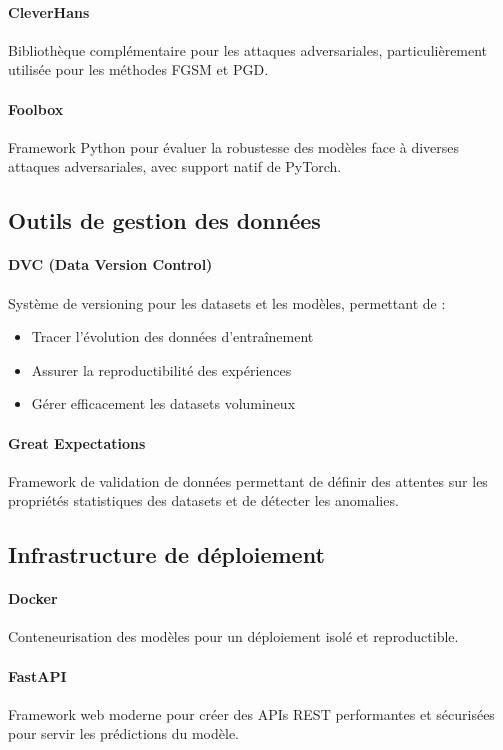 \paragraph{CleverHans}
Bibliothèque complémentaire pour les attaques adversariales, particulièrement utilisée pour les méthodes FGSM et PGD.

\paragraph{Foolbox}
Framework Python pour évaluer la robustesse des modèles face à diverses attaques adversariales, avec support natif de PyTorch.

\subsection{Outils de gestion des données}

\paragraph{DVC (Data Version Control)}
Système de versioning pour les datasets et les modèles, permettant de :
\begin{itemize}
    \item Tracer l'évolution des données d'entraînement
    \item Assurer la reproductibilité des expériences
    \item Gérer efficacement les datasets volumineux
\end{itemize}

\paragraph{Great Expectations}
Framework de validation de données permettant de définir des attentes sur les propriétés statistiques des datasets et de détecter les anomalies.

\subsection{Infrastructure de déploiement}

\paragraph{Docker}
Conteneurisation des modèles pour un déploiement isolé et reproductible.

\paragraph{FastAPI}
Framework web moderne pour créer des APIs REST performantes et sécurisées pour servir les prédictions du modèle.

